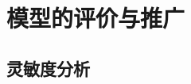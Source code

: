 



\section{模型的评价与推广} %
\label{sec:模型的评价与推广}


\subsection{灵敏度分析} %
\label{sub:灵敏度分析}






\printbibliography
\newpage
